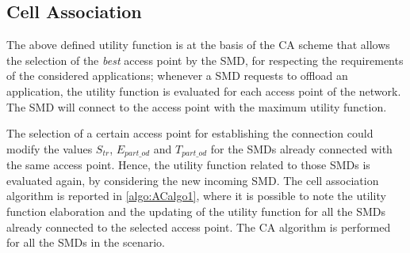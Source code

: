 \documentclass[twoside,openright]{report}
\begin{document}
\subsection*{Cell Association}
The above defined utility function is at the basis of the \gls{CA} scheme that allows the selection of the \emph{best} access point by the \gls{SMD}, for respecting the requirements of the considered applications; whenever a \gls{SMD} requests to offload an application, the utility function is evaluated for each access point of the network. 
The \gls{SMD} will connect to the access point with the maximum utility function.

The selection of a certain access point for establishing the connection could modify the values $S_\textit{tr}$, $E_{\textit{part}\_\textit{od}}$ and $T_{\textit{part}\_\textit{od}}$ for the \glspl{SMD} already connected with the same access point.
Hence, the utility function related to those \glspl{SMD} is evaluated again, by considering the new incoming \gls{SMD}. 
The cell association algorithm is reported in \autoref{algo:ACalgo1}, where it is possible to note the utility function elaboration and the updating of the utility function for all the \glspl{SMD} already connected to the selected access point.
The \gls{CA} algorithm is performed for all the \glspl{SMD} in the scenario.
 
\end{document}
